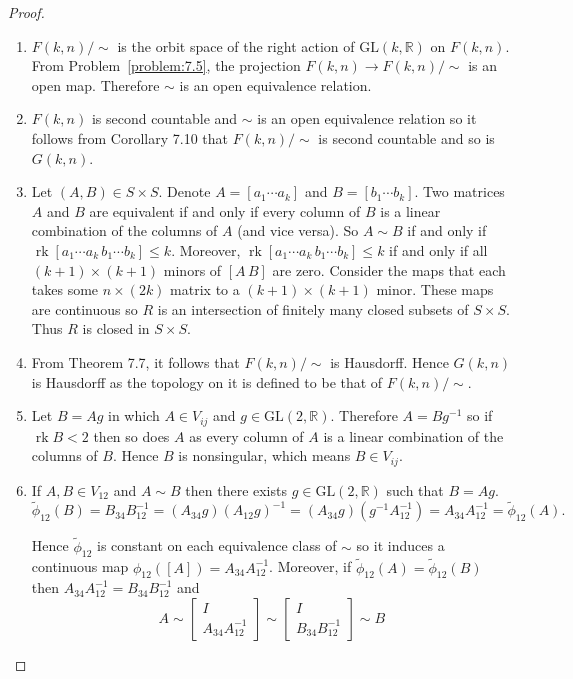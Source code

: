 \begin{proof}
    \begin{enumerate}[label={(\alph*)},leftmargin=*]
        \item \( F(k,n)/\!\sim \) is the orbit space of the right action of \( \mathrm{GL}(k, \mathbb{R}) \) on \( F(k, n) \). From Problem~\ref{problem:7.5}, the projection \( F(k,n) \to F(k,n)/\!\sim \) is an open map. Therefore \( \sim \) is an open equivalence relation.
        \item \( F(k, n) \) is second countable and \( \sim \) is an open equivalence relation so it follows from Corollary 7.10 that \( F(k, n)/\!\sim \) is second countable and so is \( G(k, n) \).
        \item Let \( (A, B) \in S \times S \). Denote \( A = [a_{1} \cdots a_{k}] \) and \( B = [b_{1} \cdots b_{k}] \). Two matrices \( A \) and \( B \) are equivalent if and only if every column of \( B \) is a linear combination of the columns of \( A \) (and vice versa). So \( A \sim B \) if and only if \( \operatorname{rk}[a_{1} \cdots a_{k}\, b_{1} \cdots b_{k}] \leq k \). Moreover, \( \operatorname{rk}[a_{1} \cdots a_{k}\, b_{1} \cdots b_{k}] \leq k \) if and only if all \( (k+1)\times (k+1) \) minors of \( [A\, B] \) are zero. Consider the maps that each takes some \( n\times (2k) \) matrix to a \( (k + 1)\times (k+1) \) minor. These maps are continuous so \( R \) is an intersection of finitely many closed subsets of \( S\times S \). Thus \( R \) is closed in \( S\times S \).
        \item From Theorem 7.7, it follows that \( F(k,n)/\!\sim \) is Hausdorff. Hence \( G(k, n) \) is Hausdorff as the topology on it is defined to be that of \( F(k, n)/\!\sim \).
        \item Let \( B = Ag \) in which \( A \in V_{ij} \) and \( g \in \mathrm{GL}(2, \mathbb{R}) \). Therefore \( A = Bg^{-1} \) so if \( \operatorname{rk}B < 2 \) then so does \(A\) as every column of \(A\) is a linear combination of the columns of \(B\). Hence \( B \) is nonsingular, which means \( B \in V_{ij} \).
        \item If \( A, B \in V_{12} \) and \( A \sim B \) then there exists \( g \in \mathrm{GL}(2, \mathbb{R}) \) such that \( B = Ag \).
              \[
                  \tilde{\phi}_{12}(B) = B_{34}B_{12}^{-1} = (A_{34}g){(A_{12}g)}^{-1} = (A_{34}g)(g^{-1}A_{12}^{-1}) = A_{34}A_{12}^{-1} = \tilde{\phi}_{12}(A).
              \]

              Hence \( \tilde{\phi}_{12} \) is constant on each equivalence class of \( \sim \) so it induces a continuous map \( \phi_{12}([A]) = A_{34}A_{12}^{-1} \). Moreover, if \( \tilde{\phi}_{12}(A) = \tilde{\phi}_{12}(B) \) then \( A_{34}A_{12}^{-1} = B_{34}B_{12}^{-1} \) and
              \[ A \sim \begin{bmatrix}I \\ A_{34}A_{12}^{-1} \end{bmatrix} \sim \begin{bmatrix}I \\ B_{34}B_{12}^{-1} \end{bmatrix} \sim B \]


\end{enumerate}
\end{proof}
